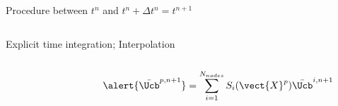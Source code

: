 \begin{frame}{Procedure between $t^n$ and $t^n + \Delta t^n=t^{n+1}$}
\begin{footnotesize}
\begin{overprint}
\begin{columns}
\begin{column}{0.6\textwidth}
\begin{block}{Explicit time integration; Interpolation}
\begin{columns}
\begin{column}{0.4\textwidth}
\begin{tikzpicture}
                \end{tikzpicture}
              \end{column}
              \begin{column}{0.55\textwidth}
                \begin{equation*}
                  \alert{\bar{\Ucb}^{p,n+1}}=\sum_{i=1}^{N_{nodes}} S_{i}(\vect{X}^{p}) \bar{\Ucb}^{i,n+1}
                \end{equation*}
              \end{column}
            \end{columns}
          \end{block}
        \end{column}
      \end{columns}
           

\end{overprint}
\end{footnotesize}
\end{frame}
